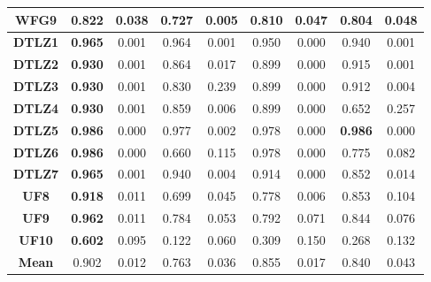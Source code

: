 \begin{table*}[t]
\begin{tabular}{c c|c|c|c|c|c|c|c}
\textbf{WFG9}  & \textbf{0.822}      & 0.038            & 0.727             & 0.005           & 0.810              & 0.047           & 0.804              & 0.048            \\ \hline
\textbf{DTLZ1} & \textbf{0.965}      & 0.001            & 0.964             & 0.001           & 0.950              & 0.000           & 0.940              & 0.001            \\ \hline
\textbf{DTLZ2} & \textbf{0.930}      & 0.001            & 0.864             & 0.017           & 0.899              & 0.000           & 0.915              & 0.001            \\ \hline
\textbf{DTLZ3} & \textbf{0.930}      & 0.001            & 0.830             & 0.239           & 0.899              & 0.000           & 0.912              & 0.004            \\ \hline
\textbf{DTLZ4} & \textbf{0.930}      & 0.001            & 0.859             & 0.006           & 0.899              & 0.000           & 0.652              & 0.257            \\ \hline
\textbf{DTLZ5} & \textbf{0.986}      & 0.000            & 0.977             & 0.002           & 0.978              & 0.000           & \textbf{0.986}     & 0.000            \\ \hline
\textbf{DTLZ6} & \textbf{0.986}      & 0.000            & 0.660             & 0.115           & 0.978              & 0.000           & 0.775              & 0.082            \\ \hline
\textbf{DTLZ7} & \textbf{0.965}      & 0.001            & 0.940             & 0.004           & 0.914              & 0.000           & 0.852              & 0.014            \\ \hline
\textbf{UF8}   & \textbf{0.918}      & 0.011            & 0.699             & 0.045           & 0.778              & 0.006           & 0.853              & 0.104            \\ \hline
\textbf{UF9}   & \textbf{0.962}      & 0.011            & 0.784             & 0.053           & 0.792              & 0.071           & 0.844              & 0.076            \\ \hline
\textbf{UF10}  & \textbf{0.602}      & 0.095            & 0.122             & 0.060           & 0.309              & 0.150           & 0.268              & 0.132            \\ \hline
\textbf{Mean}  & 0.902               & 0.012            & 0.763             & 0.036           & 0.855              & 0.017           & 0.840              & 0.043            \\ \hline
\end{tabular}%
\end{table*}

